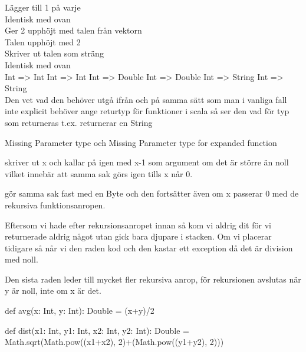 \Task

\Subtask
{} Lägger till 1 på varje\\
 Identisk med ovan\\
 Ger 2 upphöjt med talen från vektorn\\
 Talen upphöjt med 2\\
 Skriver ut talen som sträng\\
 Identisk med ovan\\

\Subtask
Int => Int
Int => Int
Int => Double
Int => Double
Int => String
Int => String \\
Den vet vad den behöver utgå ifrån och på samma sätt som man i vanliga fall inte explicit behöver ange returtyp för funktioner i scala så ser den vad för typ som returneras t.ex.  returnerar en String

\Subtask
Missing Parameter type och Missing Parameter type for expanded function

\Task

\Subtask
{} skriver ut x och kallar på  igen med x-1 som argument om det är större än noll vilket innebär att samma sak görs igen tills x når 0.

 gör samma sak fast med en Byte och den fortsätter även om x passerar 0 med de rekursiva funktionsanropen.

\Subtask
Eftersom vi hade  efter rekursionsanropet innan så kom vi aldrig dit för vi returnerade aldrig något utan gick bara djupare i stacken. Om vi placerar  tidigare så når vi den raden kod och den kastar ett exception då det är division med noll.

\Subtask
Den sista raden leder till mycket fler rekursiva anrop, för rekursionen avslutas när y är noll, inte om x är det.

\Task
\begin{REPL}
def avg(x: Int, y: Int): Double = (x+y)/2
\end{REPL}

\Task
\begin{REPL}
def dist(x1: Int, y1: Int, x2: Int, y2: Int): Double =
 Math.sqrt(Math.pow((x1+x2), 2)+(Math.pow((y1+y2), 2)))
\end{REPL}
